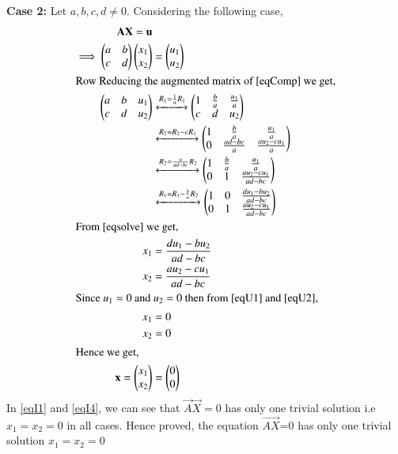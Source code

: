 \documentclass[journal,12pt,twocolumn]{IEEEtran}
\begin{document}
\textbf{Case 2: }Let $a,b,c,d\not=0$. Considering the following case,
\begin{align}
\mathbf{A}\mathbf{X} = \mathbf{u}\\
\implies\begin{pmatrix}a&b\\c&d\end{pmatrix}\begin{pmatrix}x_1\\x_2\end{pmatrix} &=\begin{pmatrix}u_1\\u_2\end{pmatrix}\label{eqComp}\\
\intertext{Row Reducing the augmented matrix of \eqref{eqComp} we get,}
\begin{pmatrix}a&b&u_1\\c&d&u_2\end{pmatrix}&\xleftrightarrow{R_1 = \frac{1}{a}R_1}\begin{pmatrix}1&\frac{b}{a}&\frac{u_1}{a}\\c&d&u_2\end{pmatrix}\\
&\xleftrightarrow{R_2 = R_2-cR_1}\begin{pmatrix}1&\frac{b}{a}&\frac{u_1}{a}\\0&\frac{ad-bc}{a}&\frac{au_2-cu_1}{a}\end{pmatrix}\\
&\xleftrightarrow{R_2=\frac{a}{ad-bc}R_2}\begin{pmatrix}1&\frac{b}{a}&\frac{u_1}{a}\\0&1&\frac{au_2-cu_1}{ad-bc}\end{pmatrix}\\
&\xleftrightarrow{R_1=R_1-\frac{b}{a}R_2}\begin{pmatrix}1&0&\frac{du_1-bu_2}{ad-bc}\\0&1&\frac{au_2-cu_1}{ad-bc}\end{pmatrix}\label{eqsolve}\\
\intertext{From \eqref{eqsolve} we get,}
x_1 &= \frac{du_1-bu_2}{ad-bc}\label{eqU1}\\
x_2 &= \frac{au_2-cu_1}{ad-bc}\label{eqU2}\\
\intertext{Since $u_1 = 0$ and $u_2 = 0$ then from \eqref{eqU1} and \eqref{eqU2},}
x_1 & = 0\\
x_2 & = 0\\
\intertext{Hence we get,}
\mathbf{x} = \begin{pmatrix}x_1\\x_2\end{pmatrix} &= \begin{pmatrix}0\\0\end{pmatrix}\label{eqI4}
\end{align}
In \eqref{eqI1} and \eqref{eqI4}, we can see that $\vec{A}\vec{X}=0$ has only one trivial solution i.e $x_1=x_2=0$ in all cases. Hence proved, the equation $\vec{AX}$=0 has only one trivial solution $x_1=x_2=0$
\end{document}
